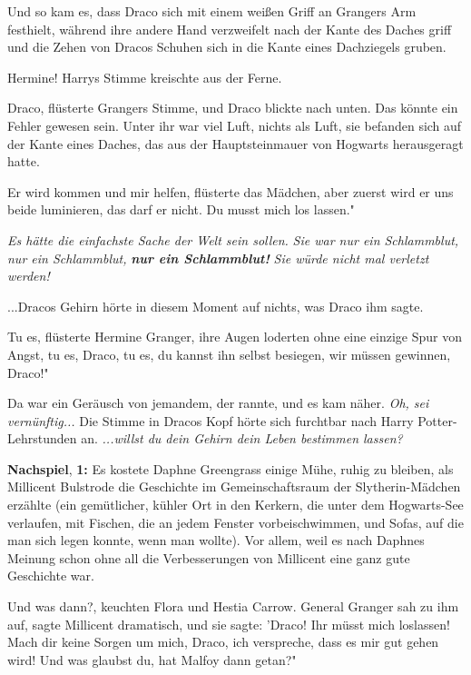 Und so kam es, dass Draco sich mit einem weißen Griff an Grangers Arm festhielt,
während ihre andere Hand verzweifelt nach der Kante des Daches griff und die
Zehen von Dracos Schuhen sich in die Kante eines Dachziegels gruben.

\glqq{}Hermine!\grqq{} Harrys Stimme kreischte aus der Ferne.

\glqq{}Draco\grqq{}, flüsterte Grangers Stimme, und Draco blickte nach unten. Das
könnte ein Fehler gewesen sein. Unter ihr war viel Luft, nichts als Luft, sie
befanden sich auf der Kante eines Daches, das aus der Hauptsteinmauer von
Hogwarts herausgeragt hatte.

\glqq{}Er wird kommen und mir helfen\grqq{}, flüsterte das Mädchen, \glqq{}aber
zuerst wird er uns beide luminieren, das darf er nicht. Du musst mich los
lassen."

\emph{Es hätte die einfachste Sache der Welt sein sollen.}
\emph{Sie war nur ein Schlammblut, nur ein Schlammblut,} \textbf{\emph{nur ein
Schlammblut!}}\emph{ Sie würde nicht mal verletzt werden!}

...Dracos Gehirn hörte in diesem Moment auf nichts, was Draco ihm sagte.

\glqq{}Tu es\grqq{}, flüsterte Hermine Granger, ihre Augen loderten ohne eine
einzige Spur von Angst, \glqq{}tu es, Draco, tu es, du kannst ihn selbst
besiegen, wir müssen gewinnen, Draco!"

Da war ein Geräusch von jemandem, der rannte, und es kam näher. \emph{ Oh, sei
vernünftig...} Die Stimme in Dracos Kopf hörte sich furchtbar nach Harry
Potter-Lehrstunden an.
\emph{...willst du dein Gehirn dein Leben bestimmen lassen?}

\textbf{Nachspiel}, \textbf{1:} Es kostete Daphne Greengrass einige Mühe, ruhig
zu bleiben, als Millicent Bulstrode die Geschichte im Gemeinschaftsraum der
Slytherin-Mädchen erzählte (ein gemütlicher, kühler Ort in den Kerkern, die
unter dem Hogwarts-See verlaufen, mit Fischen, die an jedem Fenster
vorbeischwimmen, und Sofas, auf die man sich legen konnte, wenn man wollte). Vor
allem, weil es nach Daphnes Meinung schon ohne all die Verbesserungen von
Millicent eine ganz gute Geschichte war.

\glqq{}Und was dann?\grqq{}, keuchten Flora und Hestia Carrow. \glqq{}General
Granger sah zu ihm auf\grqq{}, sagte Millicent dramatisch, \glqq{}und sie sagte:
'Draco! Ihr müsst mich loslassen! Mach dir keine Sorgen um mich, Draco, ich
verspreche, dass es mir gut gehen wird! Und was glaubst du, hat Malfoy dann
getan?"

